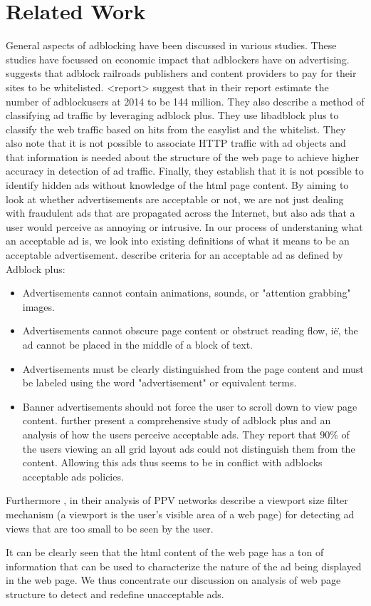 \section{{\secit Related Work}}
 General aspects of adblocking have been discussed in various studies. These studies have focussed on economic impact that adblockers have on advertising.  \cite{DigitalTrends} suggests that adblock railroads publishers and content providers to pay for their sites to be whitelisted.
<report> suggest that
in their report estimate the number of adblockusers at 2014 to be 144 million. They also
\cite{pujol2015annoyed} describe a method of classifying ad traffic by leveraging adblock plus. They use libadblock plus to classify the web traffic based on hits from the easylist and the whitelist. They also note that it is not possible to associate HTTP traffic with ad objects and that information is needed about the structure of the web page to achieve higher accuracy in detection of ad traffic. Finally, they establish that it is not possible to identify hidden ads without knowledge of the html page content.
By aiming to look at whether advertisements are acceptable or not, we are not just dealing with fraudulent ads that are propagated across the Internet, but also ads that a user would perceive as annoying or intrusive. In our process of understaning what an acceptable ad is, we look into existing definitions of what it means to be an acceptable advertisement.
\cite{walls2015measuring} describe criteria for an acceptable ad as defined by Adblock plus:
\begin{itemize}
\item Advertisements cannot contain animations, sounds, or "attention grabbing" images.
\item Advertisements cannot obscure page content or obstruct reading flow, i\.e\., the ad cannot be placed in the middle of a block
of text.
\item Advertisements must be clearly distinguished from the page
content and must be labeled using the word "advertisement"
or equivalent terms.
\item Banner advertisements should not force the user to scroll
down to view page content.
\cite{walls2015measuring} further present a comprehensive study of adblock plus and  an analysis of how the users perceive acceptable ads. They report that $ 90 \% $ of the users viewing an all grid layout ads could not distinguish them from the content. Allowing this ads thus seems to be in conflict with adblocks acceptable ads policies.
\end{itemize}

Furthermore , in their analysis of PPV networks \cite{springborn2013impression} describe a viewport size filter mechanism (a viewport is the user's visible area of a web page) for detecting ad views that are too small to be seen by the user.

It can be clearly seen that the html content of the web page has a ton of information that can be used to characterize the nature of the ad being displayed in the web page.
We thus concentrate our discussion on analysis of web page structure to detect and redefine unacceptable ads.
